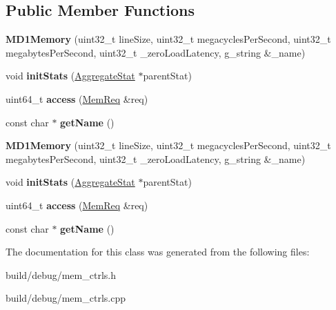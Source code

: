 \subsection*{Public Member Functions}
\begin{DoxyCompactItemize}
\item 
\hypertarget{classMD1Memory_a4664fc1ade5df44b4f6863e6f0cbf2f6}{{\bfseries M\-D1\-Memory} (uint32\-\_\-t line\-Size, uint32\-\_\-t megacycles\-Per\-Second, uint32\-\_\-t megabytes\-Per\-Second, uint32\-\_\-t \-\_\-zero\-Load\-Latency, g\-\_\-string \&\-\_\-name)}\label{classMD1Memory_a4664fc1ade5df44b4f6863e6f0cbf2f6}

\item 
\hypertarget{classMD1Memory_a657b4c85996c3ae5c88e481abc616bfe}{void {\bfseries init\-Stats} (\hyperlink{classAggregateStat}{Aggregate\-Stat} $\ast$parent\-Stat)}\label{classMD1Memory_a657b4c85996c3ae5c88e481abc616bfe}

\item 
\hypertarget{classMD1Memory_a75f00e592cf0c3feca3c01c1e9f0fd6c}{uint64\-\_\-t {\bfseries access} (\hyperlink{structMemReq}{Mem\-Req} \&req)}\label{classMD1Memory_a75f00e592cf0c3feca3c01c1e9f0fd6c}

\item 
\hypertarget{classMD1Memory_a26ccb0547e5840c22ada8b9cfc418464}{const char $\ast$ {\bfseries get\-Name} ()}\label{classMD1Memory_a26ccb0547e5840c22ada8b9cfc418464}

\item 
\hypertarget{classMD1Memory_a4664fc1ade5df44b4f6863e6f0cbf2f6}{{\bfseries M\-D1\-Memory} (uint32\-\_\-t line\-Size, uint32\-\_\-t megacycles\-Per\-Second, uint32\-\_\-t megabytes\-Per\-Second, uint32\-\_\-t \-\_\-zero\-Load\-Latency, g\-\_\-string \&\-\_\-name)}\label{classMD1Memory_a4664fc1ade5df44b4f6863e6f0cbf2f6}

\item 
\hypertarget{classMD1Memory_a657b4c85996c3ae5c88e481abc616bfe}{void {\bfseries init\-Stats} (\hyperlink{classAggregateStat}{Aggregate\-Stat} $\ast$parent\-Stat)}\label{classMD1Memory_a657b4c85996c3ae5c88e481abc616bfe}

\item 
\hypertarget{classMD1Memory_a75f00e592cf0c3feca3c01c1e9f0fd6c}{uint64\-\_\-t {\bfseries access} (\hyperlink{structMemReq}{Mem\-Req} \&req)}\label{classMD1Memory_a75f00e592cf0c3feca3c01c1e9f0fd6c}

\item 
\hypertarget{classMD1Memory_a26ccb0547e5840c22ada8b9cfc418464}{const char $\ast$ {\bfseries get\-Name} ()}\label{classMD1Memory_a26ccb0547e5840c22ada8b9cfc418464}

\end{DoxyCompactItemize}


The documentation for this class was generated from the following files\-:\begin{DoxyCompactItemize}
\item 
build/debug/mem\-\_\-ctrls.\-h\item 
build/debug/mem\-\_\-ctrls.\-cpp\end{DoxyCompactItemize}
